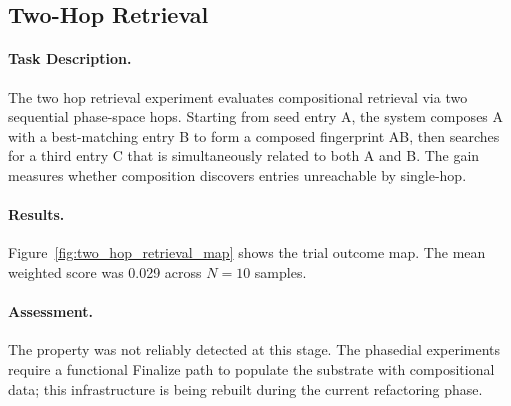\subsection{Two-Hop Retrieval}
\label{sec:two_hop_retrieval}

\paragraph{Task Description.}
The two hop retrieval experiment evaluates compositional retrieval via two sequential phase-space hops.
Starting from seed entry A, the system composes A with a best-matching
entry B to form a composed fingerprint AB, then searches for a third
entry C that is simultaneously related to both A and B.  The gain
measures whether composition discovers entries unreachable by single-hop.

\paragraph{Results.}
Figure~\ref{fig:two_hop_retrieval_map} shows the trial outcome map.
The mean weighted score was 0.029 across $N = 10$ samples.

\paragraph{Assessment.}
The property was not reliably detected at this stage.  The phasedial
experiments require a functional Finalize path to populate the substrate
with compositional data; this infrastructure is being rebuilt during
the current refactoring phase.
